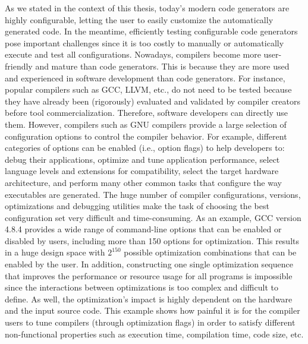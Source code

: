 As we stated in the context of this thesis, today's modern code generators are highly configurable, letting the user to easily customize the automatically generated code. In the meantime, efficiently testing configurable code generators pose important challenges since it is too costly to manually or automatically execute and test all configurations. 
Nowadays, compilers become more user-friendly and mature than code generators\cite{fursin2008milepost}. This is because they are more used and experienced in software development than code generators. For instance, popular compilers such as GCC, LLVM, etc., do not need to be tested because they have already been (rigorously) evaluated and validated by compiler creators before tool commercialization. Therefore, software developers can directly use them.
However, compilers such as GNU compilers provide a large selection of configuration options to control the compiler behavior. 
For example, different categories of options can be enabled (i.e., option flags) to help developers to: debug their applications, optimize and tune application performance, select language levels and extensions for compatibility, select the target hardware architecture, and perform many other common tasks that configure the way executables are generated.
The huge number of compiler configurations, versions, optimizations and debugging utilities make the task of choosing the best configuration set very difficult and time-consuming. As an example, GCC version 4.8.4 provides a wide range of command-line options that can be enabled or disabled by users, including more than 150 options for optimization. This results in a huge design space with $2^{150}$ possible optimization combinations that can be enabled by the user. In addition, constructing one single optimization sequence that improves the performance or resource usage for all programs is impossible since the interactions between optimizations is too complex and difficult to define. As well, the optimization's impact is highly dependent on the hardware and the input source code.
This example shows how painful it is for the compiler users to tune compilers (through optimization flags) in order to satisfy different non-functional properties such as execution time, compilation time, code size, etc.

